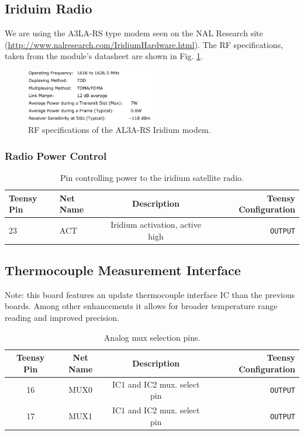 \documentclass{article}
\begin{document}
\subsection{Iriduim Radio}
We are using the A3LA-RS type modem seen on the NAL Research site (\url{http://www.nalresearch.com/IridiumHardware.html}). The RF specifications, taken from the module's datasheet are shown in Fig. \ref{fig:iridium-rf-specs}.

\begin{figure}[H]
    \centering
    \includegraphics[width=0.5\textwidth]{images/iridium-rf-specs.png}
    \caption{RF specifications of the AL3A-RS Iridium modem.}
    \label{fig:iridium-rf-specs}
\end{figure}
  
\subsubsection{Radio Power Control}
\begin{table}[H]
    \centering
    \begin{tabular}{l|l|c|r}
   Teensy Pin & Net Name     &  Description  & Teensy Configuration \\
    \hline
    23 & ACT   & Iridium activation, active high & \texttt{OUTPUT} \\
    \end{tabular}
    \caption{Pin controlling power to the iridium satellite radio.}
    \label{tab:pins_iridium}
\end{table}

\subsection{Thermocouple Measurement Interface}
Note: this board features an update thermocouple interface IC than the previous boards. Among other enhancements it allows for broader temperature range reading and improved precision.
\begin{table}[H]
    \centering
    \begin{tabular}{c|c|c|r}
    Teensy Pin & Net Name  & Description   & Teensy Configuration \\
    \hline 
    16 & MUX0 & IC1 and IC2 mux. select pin & \texttt{OUTPUT} \\
    17 & MUX1 & IC1 and IC2 mux. select pin & \texttt{OUTPUT} \\ 
    \end{tabular}
    \caption{Analog mux selection pins.}
    \label{tab:pins_thermo}
\end{table}
\end{document}
